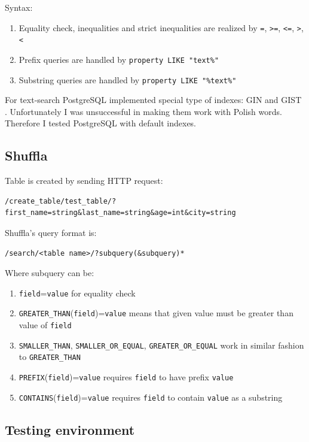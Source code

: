 \documentclass[10pt,a4paper]{article}
\begin{document}
Syntax:
\begin{enumerate}
\item Equality check, inequalities and strict inequalities are realized by \verb|=|, \verb|>=|, \verb|<=|, \verb|>|, \verb|<|
\item Prefix queries are handled by \verb|property LIKE "text%"|
\item Substring queries are handled by \verb|property LIKE "%text%"|
\end{enumerate}

For text-search PostgreSQL implemented special type of indexes: GIN \cite{PSQLGIN} and GIST \cite{PSQLGIST}. Unfortunately I was unsuccessful in making them work with Polish words. Therefore I tested PostgreSQL with default indexes.

\subsection{Shuffla}

Table is created by sending HTTP request:
\begin{verbatim}
/create_table/test_table/?first_name=string&last_name=string&age=int&city=string
\end{verbatim}
Shuffla's query format is:

\begin{verbatim}
/search/<table name>/?subquery(&subquery)*
\end{verbatim}
Where subquery can be:
\begin{enumerate}
\item \verb|field|=\verb|value| for equality check
\item \verb|GREATER_THAN|(\verb|field|)=\verb|value| means that given value must be greater than value of \verb|field| 
\item \verb|SMALLER_THAN|, \verb|SMALLER_OR_EQUAL|, \verb|GREATER_OR_EQUAL| work in similar fashion to \verb|GREATER_THAN|
\item \verb|PREFIX|(\verb|field|)=\verb|value| requires \verb|field| to have prefix \verb|value|
\item \verb|CONTAINS|(\verb|field|)=\verb|value| requires \verb|field| to contain \verb|value| as a substring
\end{enumerate}

\subsection{Testing environment}
\end{document}

